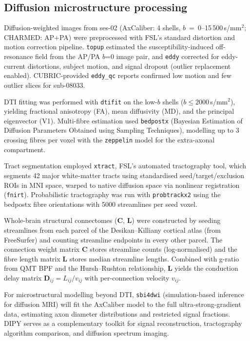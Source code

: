 \documentclass[11pt,a4paper]{article}\usepackage[]{graphicx}\usepackage[]{xcolor}
\begin{document}
\subsection{Diffusion microstructure processing}

Diffusion-weighted images from ses-02 (AxCaliber: 4 shells,
$b$~=~0--15\,500\,s/mm$^2$; CHARMED: AP+PA) were preprocessed with
FSL's standard distortion and motion correction pipeline.
\texttt{topup} estimated the susceptibility-induced off-resonance
field from the AP/PA $b$=0 image pair, and \texttt{eddy} corrected
for eddy-current distortions, subject motion, and signal dropout
(outlier replacement enabled). CUBRIC-provided \texttt{eddy\_qc}
reports confirmed low motion and few outlier slices for sub-08033.

DTI fitting was performed with \texttt{dtifit} on the low-$b$ shells
($b \leq 2000$\,s/mm$^2$), yielding fractional anisotropy (FA), mean
diffusivity (MD), and the principal eigenvector (V1). Multi-fibre
estimation used \texttt{bedpostx} (Bayesian Estimation of Diffusion
Parameters Obtained using Sampling Techniques), modelling up to 3
crossing fibres per voxel with the \texttt{zeppelin} model for the
extra-axonal compartment.

Tract segmentation employed \texttt{xtract}, FSL's automated
tractography tool, which segments 42 major white-matter tracts using
standardised seed/target/exclusion ROIs in MNI space, warped to
native diffusion space via nonlinear registration
(\texttt{fnirt}). Probabilistic tractography was run with
\texttt{probtrackx2} using the bedpostx fibre orientations with
5000 streamlines per seed voxel.

Whole-brain structural connectomes ($\mathbf{C}$, $\mathbf{L}$) were
constructed by seeding streamlines from each parcel of the
Desikan--Killiany cortical atlas (from FreeSurfer) and counting
streamline endpoints in every other parcel. The connection weight
matrix $\mathbf{C}$ stores streamline counts (log-normalised) and the
fibre length matrix $\mathbf{L}$ stores median streamline lengths.
Combined with g-ratio from QMT BPF and the Hursh--Rushton relationship,
$\mathbf{L}$ yields the conduction delay matrix
$\mathbf{D}_{ij} = L_{ij} / v_{ij}$ with per-connection velocity
$v_{ij}$.

For microstructural modelling beyond DTI, \texttt{sbi4dwi}
(simulation-based inference for diffusion MRI) will fit the AxCaliber
model to the full ultra-strong-gradient data, estimating axon diameter
distributions and restricted signal fractions. DIPY serves as a
complementary toolkit for signal reconstruction, tractography
algorithm comparison, and diffusion spectrum imaging.
\end{document}
